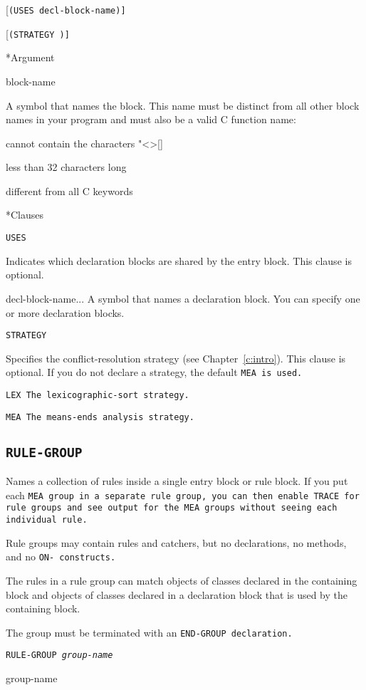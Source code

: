 {{[\tt{(USES} \tt{decl-block-name}\tt)]

[\tt{(STRATEGY} \tt{)}]

*Argument

block-name

A symbol that names the block. This name must be distinct
from all other block names in your program and must also be a
valid C function name:

cannot contain the characters "<>[]%

less than 32 characters long

different from all C keywords

*Clauses

\tt{USES}

Indicates which declaration blocks are shared by the entry block. This
clause is optional.

decl-block-name...  A symbol that names a declaration block.  You can
specify one or more declaration blocks.

\tt{STRATEGY}

Specifies the conflict-resolution strategy (see
Chapter~\ref{c:intro}).  This clause is optional. If you do not
declare a strategy, the default \tt{MEA} is used.

\tt{LEX}  The lexicographic-sort strategy.

\tt{MEA}  The means-ends analysis strategy.

\subsection{\tt{RULE-GROUP}}

Names a collection of rules inside a single entry block or rule
block. If you put each \tt{MEA} group in a separate rule group, you
can then enable \tt{TRACE} for rule groups and see output for the
\tt{MEA} groups without seeing each individual rule.

Rule groups may contain rules and catchers, but no declarations, no
methods, and no \tt{ON-} constructs.

The rules in a rule group can match objects of classes declared in the
containing block and objects of classes declared in a declaration
block that is used by the containing block.

The group must be terminated with an \tt{END-GROUP} declaration.

\Format

\tt{RULE-GROUP} \it{group-name}

\begin{arguments}
\item[group-name]


\end{arguments}}}
